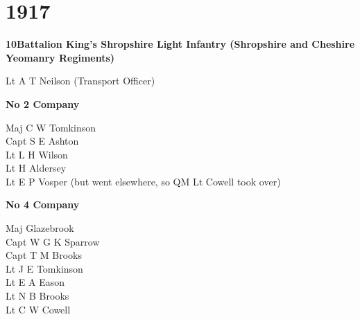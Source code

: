 \chapter*{1917}

\begin{center}
  \Large
  \textbf{10\nth Battalion King's Shropshire Light Infantry (Shropshire and Cheshire Yeomanry Regiments)}
\end{center}

\begin{multicols}{2}
  \noindent
  Lt A T Neilson (Transport Officer) \\
\end{multicols}

\begin{center}
  \Large
  \textbf{No 2 Company}
\end{center}

\begin{multicols}{2}
  \noindent
  Maj C W Tomkinson \\
  Capt S E Ashton \\
  Lt L H Wilson \\
  Lt H Aldersey \\
  Lt E P Vosper (but went elsewhere, so QM Lt Cowell took over) \\
\end{multicols}

\begin{center}
  \Large
  \textbf{No 4 Company}
\end{center}

\begin{multicols}{2}
  \noindent
  Maj Glazebrook \\
  Capt W G K Sparrow \\
  Capt T M Brooks \\
  Lt J E Tomkinson \\
  Lt E A Eason \\
  Lt N B Brooks \\
  Lt C W Cowell \\
\end{multicols}

